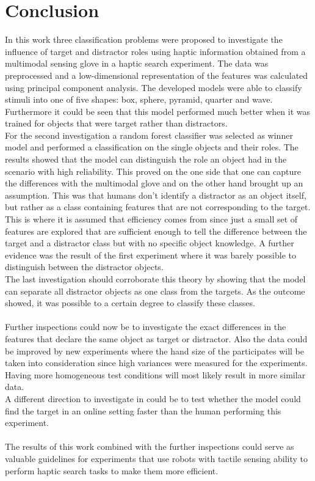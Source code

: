 
\chapter{Conclusion} %

\label{Conclusion} %
In this work three classification problems were proposed to investigate the influence of target and distractor roles using haptic information obtained from a multimodal sensing glove in a haptic search experiment. The data was preprocessed and a low-dimensional representation of the features was calculated using principal component analysis. The developed models were able to classify stimuli into one of five shapes: box, sphere, pyramid, quarter and wave. Furthermore it could be seen that this model performed much better when it was trained for objects that were target rather than distractors. \\
For the second investigation a random forest classifier was selected as winner model and performed a classification on the single objects and their roles. The results showed that the model can distinguish the role an object had in the scenario with high reliability. This proved on the one side that one can capture the differences with the multimodal glove and on the other hand brought up an assumption. This was that humans don't identify a distractor as an object itself, but rather as a class containing features that are not corresponding to the target. This is where it is assumed that efficiency comes from since just a small set of features are explored that are sufficient enough to tell the difference between the target and a distractor class but with no specific object knowledge. A further evidence was the result of the first experiment where it was barely possible to distinguish between the distractor objects.\\
The last investigation should corroborate this theory by showing that the model can separate all distractor objects as one class from the targets.  As the outcome showed, it was possible to a certain degree to classify these classes. \\
\\
Further inspections could now be to investigate the exact differences in the features that declare the same object as target or distractor. Also the data could be improved by new experiments where the hand size of the participates will be taken into consideration since high variances were measured for the experiments. Having more homogeneous test conditions will most likely result in more similar data. \\
A different direction to investigate in could be to test whether the model could find the target in an online setting faster than the human performing this experiment. \\
\\
The results of this work combined with the further inspections could serve as valuable guidelines for experiments that use robots with tactile sensing ability to perform haptic search tasks to make them more efficient.